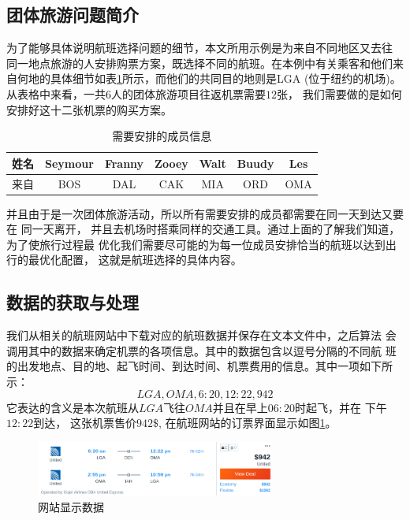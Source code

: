 \documentclass[fontset=fandol,a4paper,zihao=5]{ctexart}
\begin{document}
		\subsection{团体旅游问题简介}
			为了能够具体说明航班选择问题的细节，本文所用示例是为来自不同地区又去往
      同一地点旅游的人安排购票方案，既选择不同的航班。在本例中有关乘客和他们来
      自何地的具体细节如表\ref{tab:family_info}所示，而他们的共同目的地则是LGA
      (位于纽约的机场)。从表格中来看，一共$6$人的团体旅游项目往返机票需要$12$张，
      我们需要做的是如何安排好这十二张机票的购买方案。
			\begin{table}[!htbp]
				\centering
				\caption{需要安排的成员信息}
				\label{tab:family_info}
				\begin{tabular}{c|cccccc}
					\toprule[1pt]
					姓名 & Seymour & Franny & Zooey & Walt & Buudy & Les \\
					\hline
					来自 & BOS     & DAL	  & CAK   & MIA  & ORD   & OMA \\
					\bottomrule[1pt]
				\end{tabular} 
			\end{table}
	并且由于是一次团体旅游活动，所以所有需要安排的成员都需要在同一天到达又要在
    同一天离开， 并且去机场时搭乘同样的交通工具。通过上面的了解我们知道，为了使旅行过程最
      优化我们需要尽可能的为每一位成员安排恰当的航班以达到出行的最优化配置，
      这就是航班选择的具体内容。
		\subsection{数据的获取与处理}
			我们从相关的航班网站中下载对应的航班数据并保存在文本文件中，之后算法
      会调用其中的数据来确定机票的各项信息。其中的数据包含以逗号分隔的不同航
      班的出发地点、目的地、起飞时间、到达时间、机票费用的信息。其中一项如下所示：
      \[LGA,OMA,6:20,12:22,942\]
	  它表达的含义是本次航班从$LGA$飞往$OMA$并且在早上$06:20$时起飞，并在
      下午$12:22$到达， 这张机票售价$942\$$, 在航班网站的订票界面显示如图\ref{fig:flight_example}。
			
        \begin{figure}[!h]
            \centering
            \includegraphics[width=0.7\textwidth]{pic/flight_example.png}
            \caption{\label{fig:flight_example}网站显示数据}
        \end{figure}
			
\end{document}
